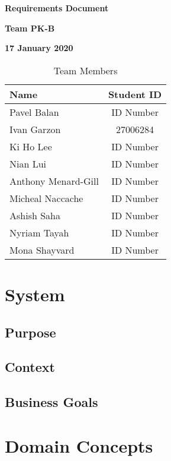 \documentclass[12pt]{article}
\begin{document}
\vspace*{0.5in}
\centerline{\bf\Large Requirements Document}

\vspace*{0.5in}
\centerline{\bf\Large Team PK-B}

\vspace*{0.5in}
\centerline{\bf\Large 17 January 2020}

\vspace*{1.5in}
\begin{table}[htbp]
\caption{Team Members}
\begin{center}
\begin{tabular}{|l | c|}
\hline
Name & Student ID \\
\hline\hline
Pavel Balan & ID Number \\ \hline
Ivan Garzon & 27006284 \\ \hline
Ki Ho Lee & ID Number \\ \hline
Nian Lui & ID Number \\ \hline
Anthony Menard-Gill & ID Number \\ \hline
Micheal Naccache & ID Number \\ \hline
Ashish Saha & ID Number \\ \hline
Nyriam Tayah & ID Number \\ \hline
Mona Shayvard & ID Number \\ \hline
\end{tabular}
\end{center}
\end{table}

\clearpage

\section{System}

\subsection{Purpose}

\subsection{Context}

\subsection{Business Goals}

\section{Domain Concepts}
\end{document}
